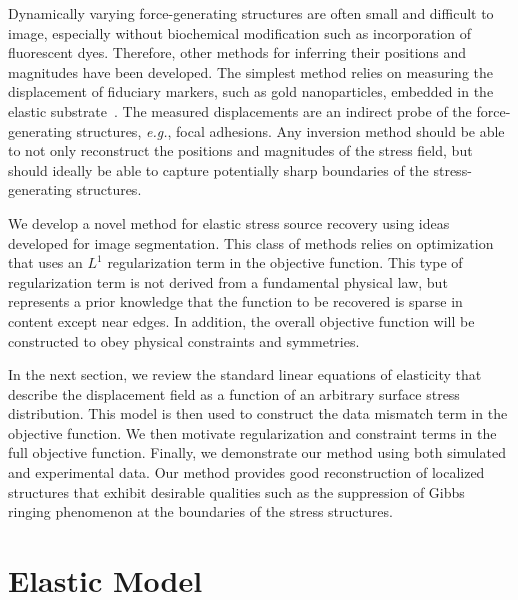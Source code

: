 \documentclass[aps,prl,reprint,twocolumn,groupedaddress,showpacs]{revtex4-1}
\begin{document}
Dynamically varying force-generating structures are often small and
difficult to image, especially without biochemical modification such
as incorporation of fluorescent dyes. Therefore, other methods for
inferring their positions and magnitudes have been developed. The
simplest method relies on measuring the displacement of fiduciary
markers, such as gold nanoparticles, embedded in the elastic
substrate~\cite{WANG2007}. The measured displacements are an
indirect probe of the force-generating structures, \textit{e.g.},
focal adhesions.  Any inversion method should be able to not only
reconstruct the positions and magnitudes of the stress field, but
should ideally be able to capture potentially sharp boundaries of the
stress-generating structures.

We develop a novel method for elastic stress source recovery
using ideas developed for image segmentation.  This class of methods
relies on optimization that uses an $L^{1}$ regularization term in the
objective function.  This type of regularization term is not derived
from a fundamental physical law, but represents a prior knowledge that
the function to be recovered is sparse in content except near
edges. In addition, the overall objective function will be constructed to obey
physical constraints and symmetries.

In the next section, we review the standard linear equations of
elasticity that describe the displacement field as a function of an
arbitrary surface stress distribution. This model is then used to
construct the data mismatch term in the objective function. We then
motivate regularization and constraint terms in the full
objective function. Finally, we demonstrate our method
using both simulated and experimental data. Our method provides
good reconstruction of localized structures that exhibit desirable
qualities such as the suppression of Gibbs ringing phenomenon at the
boundaries of the stress structures.


\section{Elastic Model}
\end{document}

